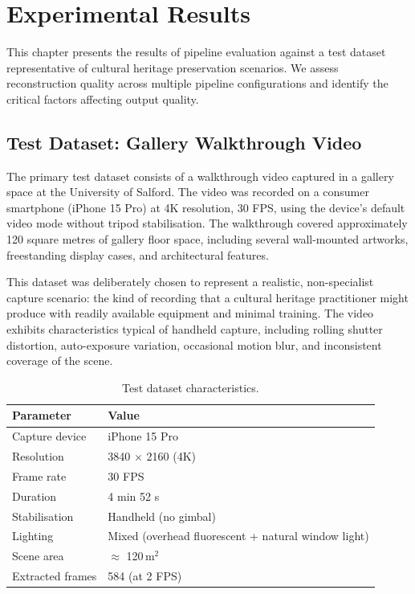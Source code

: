 \chapter{Experimental Results}
\label{ch:results}

This chapter presents the results of pipeline evaluation against a test dataset representative of cultural heritage preservation scenarios. We assess reconstruction quality across multiple pipeline configurations and identify the critical factors affecting output quality.

\section{Test Dataset: Gallery Walkthrough Video}
\label{sec:res-dataset}

The primary test dataset consists of a walkthrough video captured in a gallery space at the University of Salford. The video was recorded on a consumer smartphone (iPhone 15 Pro) at 4K resolution, 30 FPS, using the device's default video mode without tripod stabilisation. The walkthrough covered approximately 120 square metres of gallery floor space, including several wall-mounted artworks, freestanding display cases, and architectural features.

This dataset was deliberately chosen to represent a realistic, non-specialist capture scenario: the kind of recording that a cultural heritage practitioner might produce with readily available equipment and minimal training. The video exhibits characteristics typical of handheld capture, including rolling shutter distortion, auto-exposure variation, occasional motion blur, and inconsistent coverage of the scene.

\begin{table}[htbp]
  \centering
  \caption{Test dataset characteristics.}
  \label{tab:dataset}
  \begin{tabular}{@{}ll@{}}
    \toprule
    \textbf{Parameter} & \textbf{Value} \\
    \midrule
    Capture device     & iPhone 15 Pro \\
    Resolution         & 3840 $\times$ 2160 (4K) \\
    Frame rate         & 30 FPS \\
    Duration           & 4 min 52 s \\
    Stabilisation      & Handheld (no gimbal) \\
    Lighting           & Mixed (overhead fluorescent + natural window light) \\
    Scene area         & $\approx$ 120\,m$^2$ \\
    Extracted frames   & 584 (at 2 FPS) \\
    \bottomrule
  \end{tabular}
\end{table}

